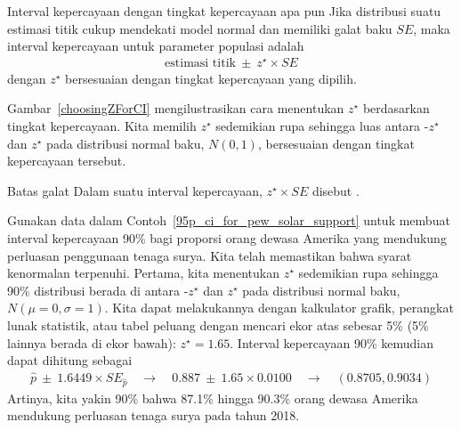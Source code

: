 \begin{onebox}{Interval kepercayaan dengan tingkat kepercayaan apa pun}
  Jika distribusi suatu estimasi titik cukup mendekati model normal
  dan memiliki galat baku $SE$, maka interval kepercayaan
  untuk parameter populasi adalah
  \begin{align*}
  \text{estimasi titik}\ \pm\ z^{\star} \times SE
  \end{align*}
  dengan $z^{\star}$ bersesuaian dengan tingkat
  kepercayaan yang dipilih.
\end{onebox}

Gambar~\ref{choosingZForCI} mengilustrasikan cara menentukan
$z^{\star}$ berdasarkan tingkat kepercayaan. Kita memilih $z^{\star}$
sedemikian rupa sehingga luas antara -$z^{\star}$ dan $z^{\star}$ pada
distribusi normal baku,
$N(0, 1)$, bersesuaian dengan tingkat kepercayaan tersebut.

\begin{onebox}{Batas galat}
  \label{marginOfErrorTermBox}%
  Dalam suatu interval kepercayaan, $z^{\star}\times SE$ disebut
  .
\end{onebox}

\begin{examplewrap}
\begin{nexample}{Gunakan data dalam
    Contoh~\ref{95p_ci_for_pew_solar_support} untuk
    membuat interval kepercayaan 90\% bagi proporsi orang dewasa Amerika
    yang mendukung perluasan penggunaan tenaga surya.
    Kita telah memastikan bahwa syarat kenormalan terpenuhi.}
  Pertama, kita menentukan $z^{\star}$ sedemikian rupa sehingga 90\% distribusi berada
  di antara -$z^{\star}$ dan $z^{\star}$ pada
  distribusi normal baku, $N(\mu = 0, \sigma = 1)$.
  Kita dapat melakukannya dengan kalkulator grafik,
  perangkat lunak statistik, atau tabel peluang dengan mencari
  ekor atas sebesar 5\% (5\% lainnya berada di ekor bawah):
  $z^{\star}=1.65$.
  Interval kepercayaan 90\% kemudian dapat dihitung sebagai
  \begin{align*}
  \hat{p}\ \pm\ 1.6449 \times SE_{\hat{p}}
      \quad\to\quad 0.887\ \pm\ 1.65 \times 0.0100
      \quad\to\quad (0.8705, 0.9034)
  \end{align*}
  Artinya, kita yakin 90\% bahwa 87.1\% hingga 90.3\% orang dewasa
  Amerika mendukung perluasan tenaga surya pada tahun 2018.
\end{nexample}
\end{examplewrap}


